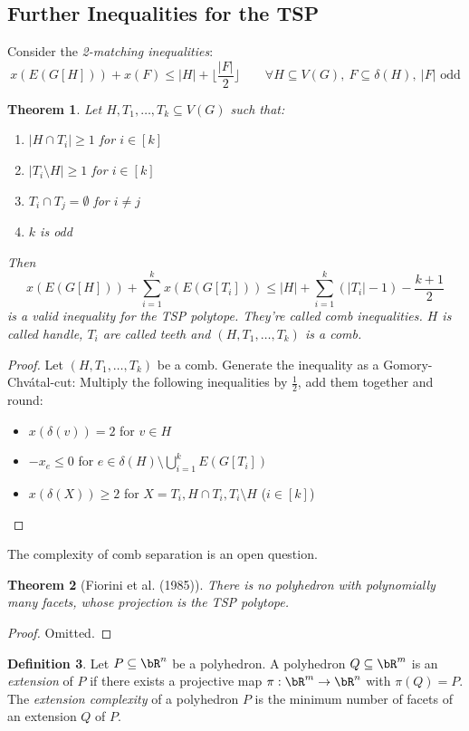 \documentclass[11pt, a4paper]{article}
\newcommand{\floor}[1]{\lfloor #1 \rfloor}
\newcommand{\abs}[1]{\left\lvert#1\right\rvert}
\newtheorem{theorem}{Theorem}[section]
\theoremstyle{remark}
\theoremstyle{definition}
\newtheorem{definition}[theorem]{Definition}
\begin{document}
\subsection{Further Inequalities for the TSP}
Consider the \emph{2-matching inequalities}:
\[x(E(G[H]))+x(F)\leq \abs{H}+\floor{\frac{\abs{F}}{2}} \qquad \forall H\subseteq V(G),\ F\subseteq\delta(H),\ \abs{F}\text{ odd}\]
\begin{theorem}
	Let $H,T_1,\ldots,T_k\subseteq V(G)$ such that:
	\begin{enumerate}
		\item $\abs{H\cap T_i}\geq1$ for $i\in[k]$
		\item $\abs{T_i\setminus H}\geq1$ for $i\in [k]$
		\item $T_i\cap T_j=\emptyset$ for $i\neq j$
		\item $k$ is odd
	\end{enumerate}
	Then
	\[x(E(G[H]))+\sum_{i=1}^kx(E(G[T_i]))\leq \abs{H}+\sum_{i=1}^k(\abs{T_i}-1)-\frac{k+1}{2}\]
	is a valid inequality for the TSP polytope. They're called \emph{comb
		inequalities}. $H$ is called \emph{handle}, $T_i$ are called
	\emph{teeth} and $(H,T_1,\ldots,T_k)$ is a comb.
\end{theorem}
\begin{proof}
	Let $(H,T_1,\ldots,T_k)$ be a comb. Generate the inequality as a
	Gomory-Chvátal-cut: Multiply the following inequalities by $\frac{1}{2}$,
	add them together and round:
	\begin{itemize}
		\item $x(\delta(v))=2$ for $v\in H$
		\item $-x_e\leq0$ for $e\in \delta(H)\setminus\bigcup_{i=1}^k E(G[T_i])$
		\item $x(\delta(X))\geq 2$ for $X=T_i,H\cap T_i,T_i\setminus H$ ($i\in[k]$)
	\end{itemize}
\end{proof}
The complexity of comb separation is an open question.


\begin{theorem}[Fiorini et al. (1985)]
	There is no polyhedron with polynomially many facets, whose projection
	is the TSP polytope.
\end{theorem}
\begin{proof}
	Omitted.
\end{proof}

\begin{definition}
	Let $P\subseteq \bR^n$ be a polyhedron. A polyhedron $Q\subseteq\bR^m$
	is an \emph{extension} of $P$ if there exists a projective map
	$\pi: \bR^m\to\bR^n$ with $\pi(Q)=P$.
	The \emph{extension complexity} of a polyhedron $P$ is the minimum number
	of facets of an extension $Q$ of $P$.
\end{definition}
\end{document}
